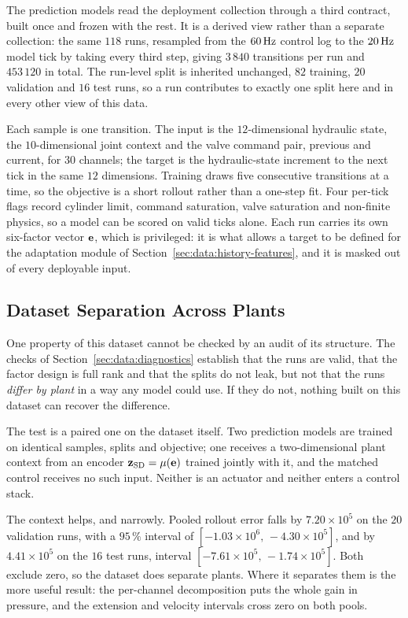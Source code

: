 The prediction models read the deployment collection through a third contract,
built once and frozen with the rest. It is a derived view rather than a separate
collection: the same $118$ runs, resampled from the $\unit[60]{Hz}$ control log
to the $\unit[20]{Hz}$ model tick by taking every third step, giving $3\,840$
transitions per run and $453\,120$ in total. The run-level split is inherited
unchanged, $82$ training, $20$ validation and $16$ test runs, so a run
contributes to exactly one split here and in every other view of this data.

Each sample is one transition. The input is the $12$-dimensional hydraulic
state, the $10$-dimensional joint context and the valve command pair, previous
and current, for $30$ channels; the target is the hydraulic-state increment to
the next tick in the same $12$ dimensions. Training draws five consecutive
transitions at a time, so the objective is a short rollout rather than a
one-step fit. Four per-tick flags record cylinder limit, command saturation,
valve saturation and non-finite physics, so a model can be scored on valid ticks
alone. Each run carries its own six-factor vector $\mathbf{e}$, which is
privileged: it is what allows a target to be defined for the adaptation module
of Section~\ref{sec:data:history-features}, and it is masked out of every
deployable input.

\subsection{Dataset Separation Across Plants}
\label{sec:data:sd-audit}

One property of this dataset cannot be checked by an audit of its structure. The
checks of Section~\ref{sec:data:diagnostics} establish that the runs are valid,
that the factor design is full rank and that the splits do not leak, but not
that the runs \emph{differ by plant} in a way any model could use. If they do
not, nothing built on this dataset can recover the difference.

The test is a paired one on the dataset itself. Two prediction models are
trained on identical samples, splits and objective; one receives a
two-dimensional plant context from an encoder $\mathbf{z}_{\mathrm{SD}} = \mu(\mathbf{e})$
trained jointly with it, and the matched control receives no such input. Neither
is an actuator and neither enters a control stack.

The context helps, and narrowly. Pooled rollout error falls by
$7.20\times10^{5}$ on the $20$ validation runs, with a $95\,\%$ interval of
$[-1.03\times10^{6},\, -4.30\times10^{5}]$, and by $4.41\times10^{5}$ on the
$16$ test runs, interval $[-7.61\times10^{5},\, -1.74\times10^{5}]$. Both
exclude zero, so the dataset does separate plants. Where it separates them is
the more useful result: the per-channel decomposition puts the whole gain in
pressure, and the extension and velocity intervals cross zero on both pools.

